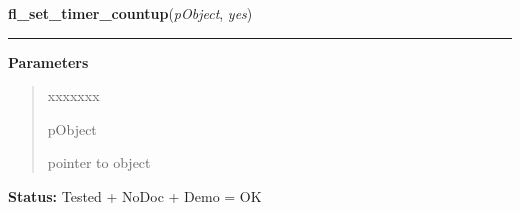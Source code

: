 \hspace{.8\funcindent}\begin{boxedminipage}{\funcwidth}

    \raggedright \textbf{fl\_set\_timer\_countup}(\textit{pObject}, \textit{yes})

    \vspace{-1.5ex}

    \rule{\textwidth}{0.5\fboxrule}
\setlength{\parskip}{2ex}
\setlength{\parskip}{1ex}
      \textbf{Parameters}
      \vspace{-1ex}

      \begin{quote}
        \begin{Ventry}{xxxxxxx}

          \item[pObject]

          pointer to object

        \end{Ventry}

      \end{quote}

\textbf{Status:} Tested + NoDoc + Demo = OK



    \end{boxedminipage}

    \label{xformslib:library:fl_set_timer_filter}

    \vspace{0.5ex}

